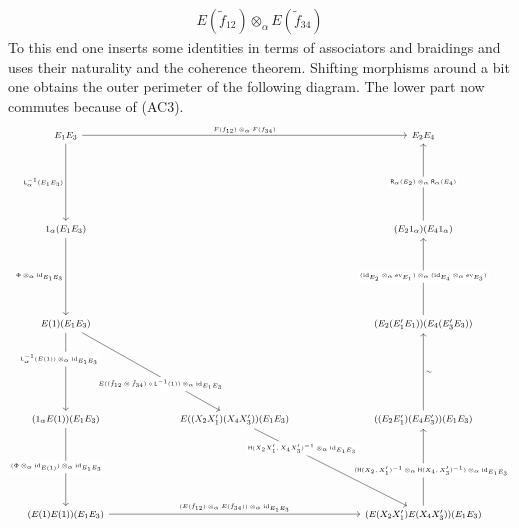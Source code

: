 \begin{prf}[Sketch]
\begin{enumerate}
\begin{align*}
  E(\tilde{f}_{12})
  \otimes_{\alpha}
  E(\tilde{f}_{34})
\end{align*}
To this end one inserts some identities in terms of associators and braidings and uses their naturality and the coherence theorem. Shifting morphisms around a bit one obtains the outer perimeter of the following diagram. The lower part now commutes because of (AC3).
\begin{equation*}
\begin{tikzcd}[row sep=7em,column sep=6em,font=\footnotesize,every label/.append style={font=\tiny}]
  E_{1} E_{3}
  \ar{rr}{F(f_{12}) \otimes_{\alpha} F(f_{34})}
  \ar{d}[swap]{\mathsf{L}_{\alpha}^{-1}(E_{1} E_{3})}
  &
  &
  E_{2} E_{4}
  \\
  1_{\alpha} (E_{1} E_{3})
  \ar{d}[swap]{\Phi \otimes_{\alpha} \mathrm{id}_{E_{1} E_{3}}}
  &
  &
  (E_{2} 1_{\alpha}) (E_{4} 1_{\alpha})
  \ar{u}[description]{\mathsf{R}_{\alpha}(E_{2}) \otimes_{\alpha} \mathsf{R}_{\alpha}(E_{4})}
  \\
  E(1) (E_{1} E_{3})
  \ar{dr}[description,xshift=3mm,yshift=-4mm]{E((\tilde{f}_{12} \otimes \tilde{f}_{34}) \circ \mathsf{L}^{-1}(1)) \otimes_{\alpha} \mathrm{id}_{E_{1} E_{3}}}
  \ar{d}[description,xshift=-2mm,yshift=4mm]{\mathsf{L}_{\alpha}^{-1}(E(1)) \otimes_{\alpha} \mathrm{id}_{E_{1} E_{3}}}
  &
  &
  (E_{2} (E_{1}^{\prime} E_{1})) (E_{4} (E_{3}^{\prime} E_{3}))
  \ar{u}[description]{(\mathrm{id}_{E_{2}} \otimes_{\alpha} \mathrm{ev}_{E_{1}}) \otimes_{\alpha} (\mathrm{id}_{E_{4}} \otimes_{\alpha} \mathrm{ev}_{E_{3}})}
  \\
  (1_{\alpha} E(1)) (E_{1} E_{3})
  \ar{d}[description,xshift=-3mm]{(\Phi \otimes_{\alpha} \mathrm{id}_{E(1)}) \otimes_{\alpha} \mathrm{id}_{E_{1} E_{3}}}
  &
  E((X_{2} X_{1}^{\prime}) (X_{4} X_{3}^{\prime})) (E_{1} E_{3})
  \ar{rd}[description,xshift=-9mm,yshift=6mm]{\mathsf{H}(X_{2} X_{1}^{\prime},X_{4} X_{3}^{\prime})^{-1} \otimes_{\alpha} \mathrm{id}_{E_{1} E_{3}}}
  &
  ((E_{2} E_{1}^{\prime}) (E_{4} E_{3}^{\prime})) (E_{1} E_{3})
  \ar{u}[swap]{\sim}
  \\
  (E(1) E(1)) (E_{1} E_{3})
  \ar{rr}{(E(\tilde{f}_{12}) \otimes_{\alpha} E(\tilde{f}_{34})) \otimes_{\alpha} \mathrm{id}_{E_{1} E_{3}}}
  &
  &
  (E(X_{2} X_{1}^{\prime}) E(X_{4} X_{3}^{\prime})) (E_{1} E_{3})
  \ar{u}[description,xshift=2.5mm,yshift=-1mm]{(\mathsf{H}(X_{2},X_{1}^{\prime})^{-1} \otimes_{\alpha} \mathsf{H}(X_{4},X_{3}^{\prime})^{-1}) \otimes_{\alpha} \mathrm{id}_{E_{1} E_{3}}}
\end{tikzcd}

\end{equation*}
\end{enumerate}
\end{prf}
